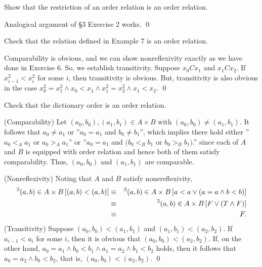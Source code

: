 \documentclass[a4paper,12pt]{article}
\begin{document}
\begin{exe}
	Show that the restriction of an order relation is an order relation.
\end{exe}\begin{sol}%
	Analogical argument of \S 3 Exercise 2 works.
	\qed\end{sol}

\begin{exe}
	Check that the relation defined in Example 7 is an order relation.
\end{exe}\begin{sol}
	Comparability is obvious,
	and we can show nonreflexivity exactly as we have done in Exercise 6.
	So, we establish transitivity.
	Suppose
	\( x_0 C x_1 \)
	and
	\( x_1 C x_2 \).
	If
	\( x_{i-1}^2 < x_{i}^2 \)
	for some
	\( i \),
	then transitivity is obvious.
	But, transitivity is also obvious in the case
	\( x_{0}^2 = x_{1}^2 
	\wedge x_0 < x_1
	\wedge x_{1}^2 = x_{2}^2
	\wedge x_{1}< x_{2}
	\).
	\qed\end{sol}

\begin{exe}
	Check that the dictionary order is an order relation.
\end{exe}\begin{sol}
	(Comparability)
	Let
	\( (a_0,b_0),(a_1,b_1) \in A\times B\)
	with
	\( (a_0,b_0) \neq (a_1,b_1) \).
	It follows that
	\( a_0 \neq a_1\)
	or
	''\( a_0 = a_1\) and \(b_0 \neq b_1\)'',
	which implies there hold either
	''\( a_0 <_{A} a_1 \) or \( a_0 >_{A} a_1 \)''
	or
	''\( a_0 = a_1 \) and 
	\( ( b_0 <_{B} b_1\) or \( b_0 >_{B} b_1 ) \).''
	since each of \( A \) and \( B \) is equipped with order relation and hence
	both of them satisfy comparability.
	Thus,
	\( (a_0,b_0) \)
	and
	\( (a_1,b_1) \)
	are comparable.
	
	(Nonreflexivity)
	Noting that
	\( A \)
	and
	\( B \)
	satisfy nonereflexivity,
	\begin{eqnarray*}
		{}^{\exists} (a,b)\in A \times B\left[ (a,b) < (a,b) \right]
		&\equiv&
		{}^{\exists} (a,b)\in A \times B\left[ a<a \vee (a=a \wedge b<b) \right]\\
		&\equiv&
		{}^{\exists} (a,b)\in A \times B\left[ F \vee (T \wedge F) \right]\\
		&\equiv&
		F.
	\end{eqnarray*}
	\indent(Transitivity)
	Suppose
	\( (a_0,b_0) < (a_{1},b_{1})\)
	and
	\( (a_1,b_1) < (a_{2},b_{2})\).
	If
	\( a_{i-1} < a_i \)
	for some \( i \),
	then it is obvious that
	\( (a_0,b_0) < (a_{2},b_{2})\).
	If, on the other hand,
	\( a_0 = a_1 \wedge b_0 <b_1 \wedge a_1=a_2 \wedge b_1 < b_2 \)
	holds,
	then it follows that 
	\( a_0 = a_2 \wedge b_0 < b_2 \),
	that is,
	\( (a_0,b_0) < (a_{2},b_{2})\).
	\qed\end{sol}
\end{document}
